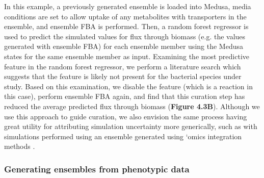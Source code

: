 \documentclass[11pt,onecolumn,notitlepage,openany,twoside]{book}
\begin{document}
\begin{refsection}
In this example, a previously generated ensemble is loaded into Medusa, media conditions are set to allow uptake of any metabolites with transporters in the ensemble, and ensemble FBA is performed. Then, a random forest regressor is used to predict the simulated values for flux through biomass (e.g. the values generated with ensemble FBA) for each ensemble member using the Medusa states for the same ensemble member as input. Examining the most predictive feature in the random forest regressor, we perform a literature search which suggests that the feature is likely not present for the bacterial species under study. Based on this examination, we disable the feature (which is a reaction in this case), perform ensemble FBA again, and find that this curation step has reduced the average predicted flux through biomass (\textbf{Figure 4.3B}). Although we use this approach to guide curation, we also envision the same process having great utility for attributing simulation uncertainty more generically, such as with simulations performed using an ensemble generated using ‘omics integration methods \cite{Blazier2012-oo}.

\subsubsection{Generating ensembles from phenotypic data}


\end{refsection}
\end{document}
